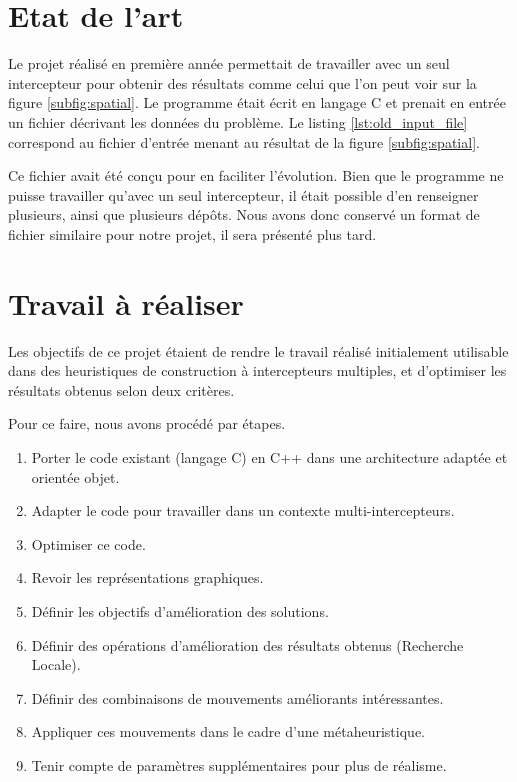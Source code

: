     \section{Etat de l'art}

    	Le projet réalisé en première année permettait de travailler avec un seul intercepteur pour obtenir des résultats comme celui que l'on peut voir sur la figure \ref{subfig:spatial}. Le programme était écrit en langage C et prenait en entrée un fichier décrivant les données du problème. Le listing \ref{lst:old_input_file} correspond au fichier d'entrée menant au résultat de la figure \ref{subfig:spatial}.

    	Ce fichier avait été conçu pour en faciliter l'évolution. Bien que le programme ne puisse travailler qu'avec un seul intercepteur, il était possible d'en renseigner plusieurs, ainsi que plusieurs dépôts. Nous avons donc conservé un format de fichier similaire pour notre projet, il sera présenté plus tard.

    	\begin{code}
    		\label{lst:old_input_file}
    	\end{code}

    \section{Travail à réaliser}
    	Les objectifs de ce projet étaient de rendre le travail réalisé initialement utilisable dans des heuristiques de construction à intercepteurs multiples, et d'optimiser les résultats obtenus selon deux critères. 

    	Pour ce faire, nous avons procédé par étapes. 
    	\begin{enumerate}
    		\item Porter le code existant (langage C) en C++ dans une architecture adaptée et orientée objet.
    		\item Adapter le code pour travailler dans un contexte multi-intercepteurs.
    		\item Optimiser ce code.
    		\item Revoir les représentations graphiques.
    		\item Définir les objectifs d'amélioration des solutions.
    		\item Définir des opérations d'amélioration des résultats obtenus (Recherche Locale).
    		\item Définir des combinaisons de mouvements améliorants intéressantes.
    		\item Appliquer ces mouvements dans le cadre d'une métaheuristique.
    		\item Tenir compte de paramètres supplémentaires pour plus de réalisme.
    	\end{enumerate}

